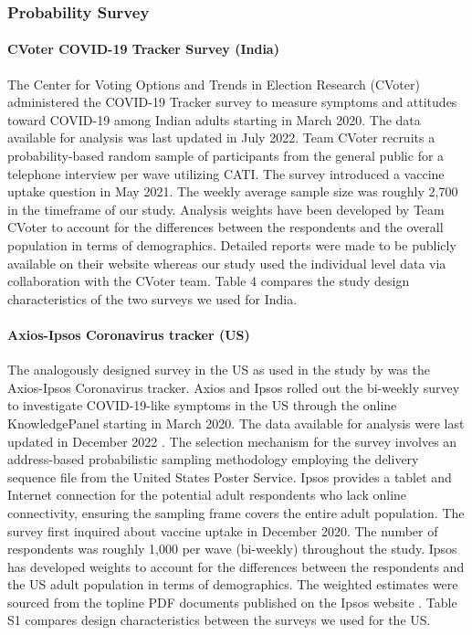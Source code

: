 \documentclass{article}
\begin{document}
\subsubsection{Probability Survey}

\paragraph{CVoter COVID-19 Tracker Survey (India)} The Center for Voting Options and Trends in Election Research (CVoter) administered the COVID-19 Tracker survey to measure symptoms and attitudes toward COVID-19 among Indian adults \citep{CVotermethod} starting in March 2020. The data available for analysis was last updated in July 2022. Team CVoter recruits a probability-based random sample of participants from the general public for a telephone interview per wave utilizing CATI. The survey introduced a vaccine uptake question in May 2021. The weekly average sample size was roughly 2,700 in the timeframe of our study. Analysis weights have been developed by Team CVoter to account for the differences between the respondents and the overall population in terms of demographics. Detailed reports were made to be publicly available on their website \citep{CVoter} whereas our study used the individual level data via collaboration with the CVoter team. Table 4 compares the study design characteristics of the two surveys we used for India. 

\paragraph{Axios-Ipsos Coronavirus tracker (US)} The analogously designed survey in the US as used in the study by \cite{Bradley2021-io} was the Axios-Ipsos Coronavirus tracker. Axios and Ipsos rolled out the bi-weekly survey to investigate COVID-19-like symptoms in the US through the online KnowledgePanel starting in March 2020. The data available for analysis were last updated in December 2022 \citep{Jackson2021}. The selection mechanism for the survey involves an address-based probabilistic sampling methodology employing the delivery sequence file from the United States Poster Service. Ipsos provides a tablet and Internet connection for the potential adult respondents who lack online connectivity, ensuring the sampling frame covers the entire adult population. The survey first inquired about vaccine uptake in December 2020. The number of respondents was roughly 1,000 per wave (bi-weekly) throughout the study. Ipsos has developed weights to account for the differences between the respondents and the US adult population in terms of demographics. The weighted estimates were sourced from the topline PDF documents published on the Ipsos website \citep{Jackson2021}. Table S1 compares design characteristics between the surveys we used for the US. 
\end{document}
